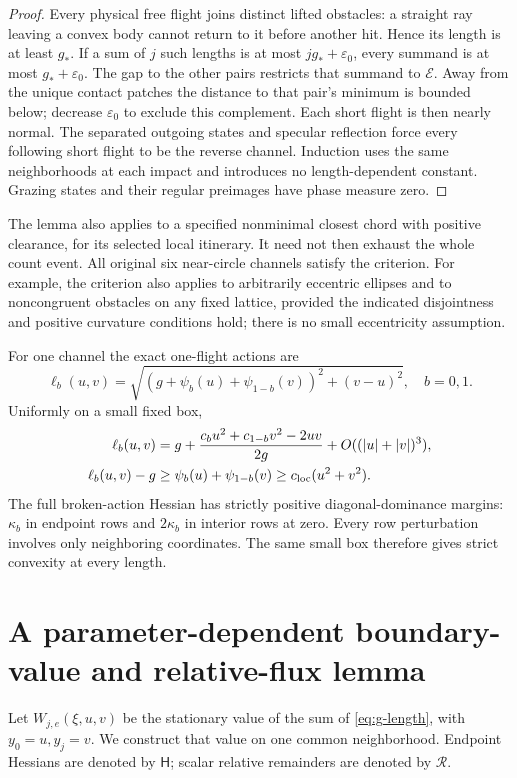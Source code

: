 \begin{proof}
Every physical free flight joins distinct lifted obstacles: a straight
ray leaving a convex body cannot return to it before another hit. Hence
its length is at least $g_*$. If a sum of $j$ such lengths is at most
$jg_*+\varepsilon_0$, every summand is at most $g_*+\varepsilon_0$.
The gap to the other pairs restricts that summand to $\mathcal E$.
Away from the unique contact patches the distance to that pair's
minimum is bounded below; decrease $\varepsilon_0$ to exclude this
complement. Each short flight is then nearly normal. The separated
outgoing states and specular reflection force every following short
flight to be the reverse channel. Induction uses the same neighborhoods
at each impact and introduces no length-dependent constant. Grazing
states and their regular preimages have phase measure zero.
\end{proof}

The lemma also applies to a specified nonminimal closest chord with
positive clearance, for its selected local itinerary. It need not then
exhaust the whole count event. All original six near-circle channels
satisfy the criterion. For example, the criterion also applies to
arbitrarily eccentric ellipses and to noncongruent obstacles on any
fixed lattice, provided the indicated disjointness and positive
curvature conditions hold; there is no small eccentricity assumption.

For one channel the exact one-flight actions are
\begin{equation}\label{eq:g-length}
 \ell_b(u,v)=\sqrt{(g+\psi_b(u)+\psi_{1-b}(v))^2+(v-u)^2},\quad b=0,1.
\end{equation}
Uniformly on a small fixed box,
\begin{align}\label{eq:g-length-jet}
 \ell_b(u,v)&=g+\frac{c_bu^2+c_{1-b}v^2-2uv}{2g}
                  +O((|u|+|v|)^3),\\
 \ell_b(u,v)-g&\ge\psi_b(u)+\psi_{1-b}(v)
                       \ge c_{\rm loc}(u^2+v^2).
 \label{eq:g-coercive}
\end{align}
The full broken-action Hessian has strictly positive diagonal-dominance
margins: $\kappa_b$ in endpoint rows and $2\kappa_b$ in interior rows
at zero. Every row perturbation involves only neighboring coordinates.
The same small box therefore gives strict convexity at every length.

\section{A parameter-dependent boundary-value and relative-flux lemma}
\label{sec:g-action}
Let $W_{j,e}(\xi,u,v)$ be the stationary value of the sum of
\eqref{eq:g-length}, with $y_0=u,y_j=v$. We construct that value on
one common neighborhood. Endpoint Hessians are denoted by
$\mathsf H$; scalar relative remainders are denoted by $\mathcal R$.


